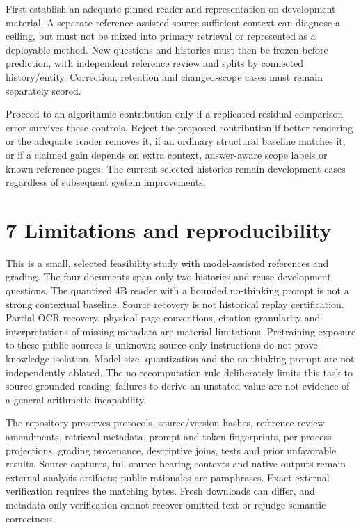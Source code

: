 \documentclass[11pt]{article}
\begin{document}
First establish an adequate pinned reader and representation on development material. A separate reference-assisted source-sufficient context can diagnose a ceiling, but must not be mixed into primary retrieval or represented as a deployable method. New questions and histories must then be frozen before prediction, with independent reference review and splits by connected history/entity. Correction, retention and changed-scope cases must remain separately scored.

Proceed to an algorithmic contribution only if a replicated residual comparison error survives these controls. Reject the proposed contribution if better rendering or the adequate reader removes it, if an ordinary structural baseline matches it, or if a claimed gain depends on extra context, answer-aware scope labels or known reference pages. The current selected histories remain development cases regardless of subsequent system improvements.

\section*{7  Limitations and reproducibility}
This is a small, selected feasibility study with model-assisted references and grading. The four documents span only two histories and reuse development questions. The quantized 4B reader with a bounded no-thinking prompt is not a strong contextual baseline. Source recovery is not historical replay certification. Partial OCR recovery, physical-page conventions, citation granularity and interpretations of missing metadata are material limitations. Pretraining exposure to these public sources is unknown; source-only instructions do not prove knowledge isolation. Model size, quantization and the no-thinking prompt are not independently ablated. The no-recomputation rule deliberately limits this task to source-grounded reading; failures to derive an unstated value are not evidence of a general arithmetic incapability.

The repository preserves protocols, source/version hashes, reference-review amendments, retrieval metadata, prompt and token fingerprints, per-process projections, grading provenance, descriptive joins, tests and prior unfavorable results. Source captures, full source-bearing contexts and native outputs remain external analysis artifacts; public rationales are paraphrases. Exact external verification requires the matching bytes. Fresh downloads can differ, and metadata-only verification cannot recover omitted text or rejudge semantic correctness.
\end{document}
